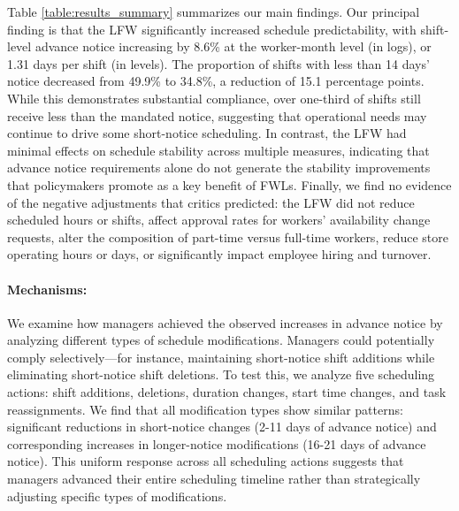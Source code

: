 \documentclass[letterpaper,11pt,leqno]{article}
\theoremstyle{paper}
\begin{document}
Table \ref{table:results_summary} summarizes our main findings. Our principal finding is that the LFW significantly increased schedule predictability, with shift-level advance notice increasing by 8.6\% at the worker-month level (in logs), or 1.31 days per shift (in levels). The proportion of shifts with less than 14 days' notice decreased from 49.9\% to 34.8\%, a reduction of 15.1 percentage points. While this demonstrates substantial compliance, over one-third of shifts still receive less than the mandated notice, suggesting that operational needs may continue to drive some short-notice scheduling. In contrast, the LFW had minimal effects on schedule stability across multiple measures, indicating that advance notice requirements alone do not generate the stability improvements that policymakers promote as a key benefit of FWLs. Finally, we find no evidence of the negative adjustments that critics predicted: the LFW did not reduce scheduled hours or shifts, affect approval rates for workers' availability change requests, alter the composition of part-time versus full-time workers, reduce store operating hours or days, or significantly impact employee hiring and turnover. 


\paragraph{Mechanisms:}
We examine how managers achieved the observed increases in advance notice by analyzing different types of schedule modifications. Managers could potentially comply selectively—for instance, maintaining short-notice shift additions while eliminating short-notice shift deletions. To test this, we analyze five scheduling actions: shift additions, deletions, duration changes, start time changes, and task reassignments. We find that all modification types show similar patterns: significant reductions in short-notice changes (2-11 days of advance notice) and corresponding increases in longer-notice modifications (16-21 days of advance notice). This uniform response across all scheduling actions suggests that managers advanced their entire scheduling timeline rather than strategically adjusting specific types of modifications.
\end{document}
